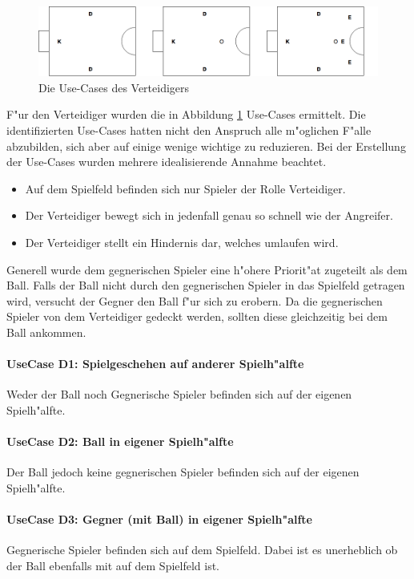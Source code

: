 \begin{figure}[H]
	\centering
	\includegraphics[width=\ScaleIfNeeded]{Grafiken/KI/defender/useCases.png}
	\caption{Die Use-Cases des Verteidigers}
	\label{Usecases-Verteidigers}
\end{figure}

F"ur den Verteidiger wurden die in Abbildung \ref{Usecases-Verteidigers} Use-Cases ermittelt. Die identifizierten Use-Cases hatten nicht den Anspruch alle m"oglichen F"alle abzubilden, sich aber auf einige wenige wichtige zu reduzieren. Bei der Erstellung der Use-Cases wurden mehrere idealisierende Annahme beachtet.

\begin{itemize}
\item Auf dem Spielfeld befinden sich nur Spieler der Rolle Verteidiger.
\item Der Verteidiger bewegt sich in jedenfall genau so schnell wie der Angreifer.
\item Der Verteidiger stellt ein Hindernis dar, welches umlaufen wird.
\end{itemize}

Generell wurde dem gegnerischen Spieler eine h"ohere Priorit"at zugeteilt als dem Ball. Falls der Ball nicht durch den gegnerischen Spieler in das Spielfeld getragen wird, versucht der Gegner den Ball f"ur sich zu erobern. Da die gegnerischen Spieler von dem Verteidiger gedeckt werden, sollten diese gleichzeitig bei dem Ball ankommen.

\paragraph{UseCase D1: Spielgeschehen auf anderer Spielh"alfte}
\label{UseCaseD1}
Weder der Ball noch Gegnerische Spieler befinden sich auf der eigenen Spielh"alfte.
\paragraph{UseCase D2: Ball in eigener Spielh"alfte}
\label{UseCaseD2}
Der Ball jedoch keine gegnerischen Spieler befinden sich auf der eigenen Spielh"alfte.
\paragraph{UseCase D3: Gegner (mit Ball) in eigener Spielh"alfte}
\label{UseCaseD3}
Gegnerische Spieler befinden sich auf dem Spielfeld. Dabei ist es unerheblich ob der Ball ebenfalls mit auf dem Spielfeld ist.

